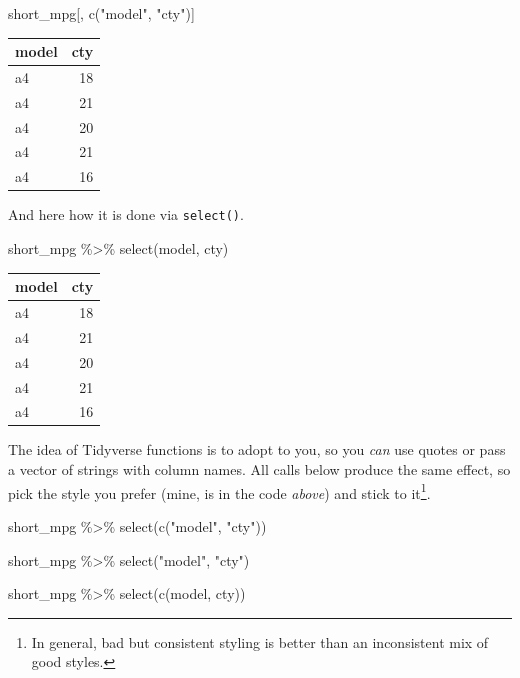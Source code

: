 \documentclass[
]{book}
\newenvironment{Shaded}{\begin{snugshade}}{\end{snugshade}}
\newcommand{\FunctionTok}[1]{\textcolor[rgb]{0.00,0.00,0.00}{#1}}
\newcommand{\NormalTok}[1]{#1}
\newcommand{\SpecialCharTok}[1]{\textcolor[rgb]{0.00,0.00,0.00}{#1}}
\newcommand{\StringTok}[1]{\textcolor[rgb]{0.31,0.60,0.02}{#1}}
\begin{document}
\begin{Shaded}
\begin{Highlighting}[]
\NormalTok{short\_mpg[, }\FunctionTok{c}\NormalTok{(}\StringTok{"model"}\NormalTok{, }\StringTok{"cty"}\NormalTok{)] }
\end{Highlighting}
\end{Shaded}

\begin{tabular}{l|r}
\hline
model & cty\\
\hline
a4 & 18\\
\hline
a4 & 21\\
\hline
a4 & 20\\
\hline
a4 & 21\\
\hline
a4 & 16\\
\hline
\end{tabular}

And here how it is done via \texttt{select()}.

\begin{Shaded}
\begin{Highlighting}[]
\NormalTok{short\_mpg }\SpecialCharTok{\%\textgreater{}\%}
  \FunctionTok{select}\NormalTok{(model, cty)}
\end{Highlighting}
\end{Shaded}

\begin{tabular}{l|r}
\hline
model & cty\\
\hline
a4 & 18\\
\hline
a4 & 21\\
\hline
a4 & 20\\
\hline
a4 & 21\\
\hline
a4 & 16\\
\hline
\end{tabular}

The idea of Tidyverse functions is to adopt to you, so you \emph{can} use quotes or pass a vector of strings with column names. All calls below produce the same effect, so pick the style you prefer (mine, is in the code \emph{above}) and stick to it\footnote{In general, bad but consistent styling is better than an inconsistent mix of good styles.}.

\begin{Shaded}
\begin{Highlighting}[]
\NormalTok{short\_mpg }\SpecialCharTok{\%\textgreater{}\%}
  \FunctionTok{select}\NormalTok{(}\FunctionTok{c}\NormalTok{(}\StringTok{"model"}\NormalTok{, }\StringTok{"cty"}\NormalTok{))}
  
\NormalTok{short\_mpg }\SpecialCharTok{\%\textgreater{}\%}
  \FunctionTok{select}\NormalTok{(}\StringTok{"model"}\NormalTok{, }\StringTok{"cty"}\NormalTok{)}
  
\NormalTok{short\_mpg }\SpecialCharTok{\%\textgreater{}\%}
  \FunctionTok{select}\NormalTok{(}\FunctionTok{c}\NormalTok{(model, cty))}
\end{Highlighting}
\end{Shaded}
\end{document}
